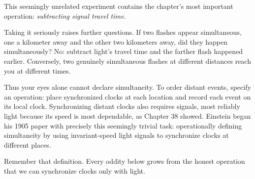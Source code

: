 \begin{mainline}
This seemingly unrelated experiment contains the chapter's most important operation: \emph{subtracting signal travel time}.

Taking it seriously raises further questions. If two flashes appear simultaneous, one a kilometer away and the other two kilometers away, did they happen simultaneously? No: subtract light's travel time and the farther flash happened earlier. Conversely, two genuinely simultaneous flashes at different distances reach you at different times.

Thus your eyes alone cannot declare simultaneity. To order distant events, specify an operation: place synchronized clocks at each location and record each event on its local clock. Synchronizing distant clocks also requires signals, most reliably light because its speed is most dependable, as Chapter 38 showed. Einstein began his 1905 paper with precisely this seemingly trivial task: operationally defining simultaneity by using invariant-speed light signals to synchronize clocks at different places.

Remember that definition. Every oddity below grows from the honest operation that we can synchronize clocks only with light.
\end{mainline}


